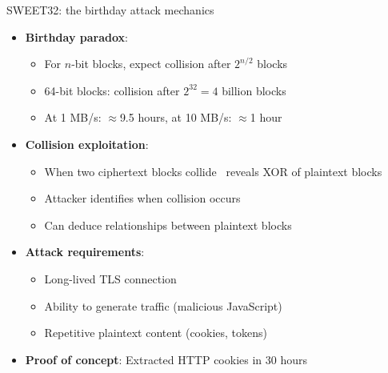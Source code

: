 \ifdefined\PRESENTATION\else\PassOptionsToClass{handout}{beamer}\fi\documentclass[aspectratio=169, lualatex]{beamer}
\begin{document}
\begin{frame}{SWEET32: the birthday attack mechanics}
	\begin{itemize}
		\item \textbf{Birthday paradox}:
		      \begin{itemize}
			      \item For $n$-bit blocks, expect collision after $2^{n/2}$ blocks
			      \item 64-bit blocks: collision after $2^{32} = 4$ billion blocks
			      \item At 1 MB/s: $\approx$9.5 hours, at 10 MB/s: $\approx$1 hour
		      \end{itemize}
		\item \textbf{Collision exploitation}:
		      \begin{itemize}
			      \item When two ciphertext blocks collide \rightarrow\ reveals XOR of plaintext blocks
			      \item Attacker identifies when collision occurs
			      \item Can deduce relationships between plaintext blocks
		      \end{itemize}
		\item \textbf{Attack requirements}:
		      \begin{itemize}
			      \item Long-lived TLS connection
			      \item Ability to generate traffic (malicious JavaScript)
			      \item Repetitive plaintext content (cookies, tokens)
		      \end{itemize}
		\item \textbf{Proof of concept}: Extracted HTTP cookies in 30 hours
	\end{itemize}
\end{frame}
\end{document}
